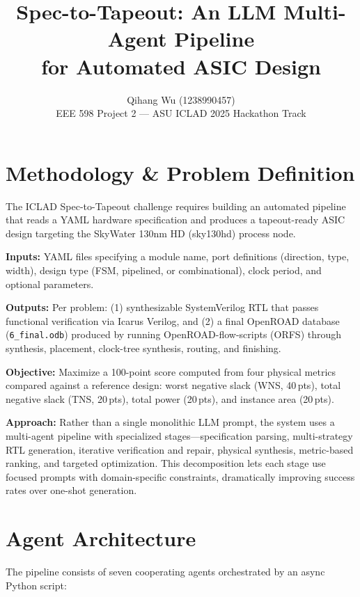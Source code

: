 \documentclass[10pt]{article}
\title{\textbf{Spec-to-Tapeout: An LLM Multi-Agent Pipeline\\for Automated ASIC Design}}
\author{Qihang Wu (1238990457)\\ EEE 598 Project 2 --- ASU ICLAD 2025 Hackathon Track}
\date{}
\begin{document}
\maketitle

\section{Methodology \& Problem Definition}

The ICLAD Spec-to-Tapeout challenge requires building an automated pipeline that reads 
a YAML hardware specification and produces a tapeout-ready ASIC design targeting 
the SkyWater 130nm HD (sky130hd) process node.

\textbf{Inputs:} YAML files specifying a module name, 
port definitions (direction, type, width), 
design type (FSM, pipelined, or combinational), 
clock period, and optional parameters.

\textbf{Outputs:} Per problem: 
(1) synthesizable SystemVerilog RTL that passes functional verification via Icarus Verilog, 
and (2) a final OpenROAD database (\texttt{6\_final.odb}) produced by running OpenROAD-flow-scripts (ORFS) 
through synthesis, placement, clock-tree synthesis, routing, and finishing.

\textbf{Objective:} Maximize a 100-point score computed from four physical metrics 
compared against a reference design: worst negative slack (WNS, 40\,pts), 
total negative slack (TNS, 20\,pts), total power (20\,pts), and instance area (20\,pts).

\textbf{Approach:} Rather than a single monolithic LLM prompt, 
the system uses a multi-agent pipeline with specialized stages---specification parsing, multi-strategy RTL generation, 
iterative verification and repair, physical synthesis, metric-based ranking, 
and targeted optimization. This decomposition lets each stage use focused prompts 
with domain-specific constraints, dramatically improving success rates over one-shot generation.

\section{Agent Architecture}

The pipeline consists of seven cooperating agents orchestrated by an async Python script:
\end{document}
